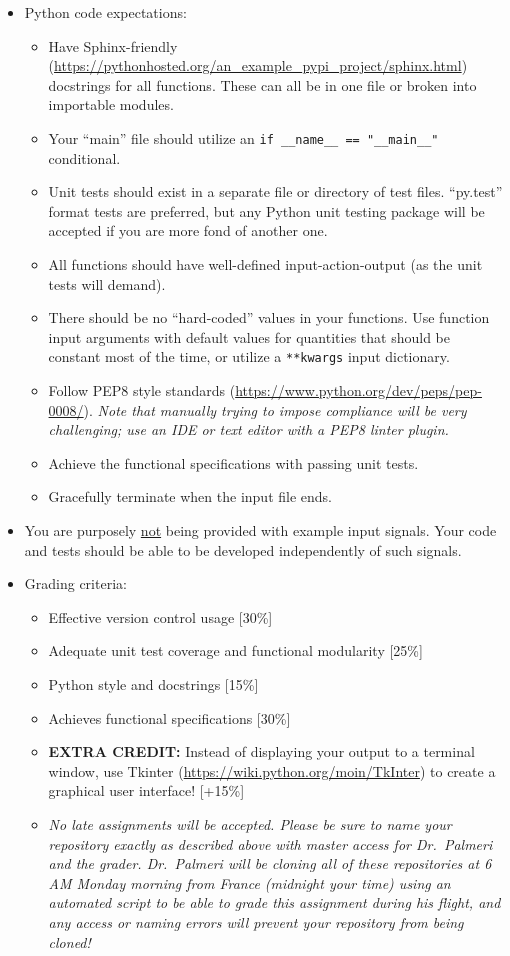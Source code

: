 \begin{itemize}
\item Python code expectations:
\begin{itemize}
    \item Have Sphinx-friendly (\url{https://pythonhosted.org/an_example_pypi_project/sphinx.html}) docstrings for all functions.  These can all be in one file or broken into importable modules.
    \item Your ``main'' file should utilize an \verb+if __name__ == "__main__"+ conditional.
    \item Unit tests should exist in a separate file or directory of test files.  ``py.test'' format tests are preferred, but any Python unit testing package will be accepted if you are more fond of another one.
    \item All functions should have well-defined input-action-output (as the unit tests will demand).
    \item There should be no ``hard-coded'' values in your functions.  Use function input arguments with default values for quantities that should be constant most of the time, or utilize a \verb+**kwargs+ input dictionary.
    \item Follow PEP8 style standards (\url{https://www.python.org/dev/peps/pep-0008/}).  \emph{Note that manually trying to impose compliance will be very challenging; use an IDE or text editor with a PEP8 linter plugin.}
    \item Achieve the functional specifications with passing unit tests.
    \item Gracefully terminate when the input file ends.
\end{itemize}

\item You are purposely \underline{not} being provided with example input signals.  Your code and tests should be able to be developed independently of such signals.

\item Grading criteria:
\begin{itemize}
    \item Effective version control usage [30\%]
    \item Adequate unit test coverage and functional modularity [25\%]
    \item Python style and docstrings [15\%]
    \item Achieves functional specifications [30\%]
    \item \textbf{EXTRA CREDIT:} Instead of displaying your output to a terminal window, use Tkinter (\url{https://wiki.python.org/moin/TkInter}) to create a graphical user interface!  [+15\%]
    \item \emph{No late assignments will be accepted.  Please be sure to name your repository exactly as described above with master access for Dr.~Palmeri and the grader.  Dr.~Palmeri will be cloning all of these repositories at 6 AM Monday morning from France (midnight your time) using an automated script to be able to grade this assignment during his flight, and any access or naming errors will prevent your repository from being cloned!}
\end{itemize}




\end{itemize}

